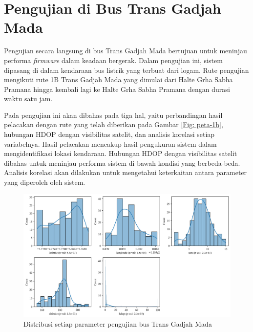 \section{Pengujian di Bus Trans Gadjah Mada}
Pengujian secara langsung di bus Trans Gadjah Mada bertujuan untuk meninjau performa \textit{firmware} dalam keadaan bergerak. Dalam pengujian ini, sistem dipasang di dalam kendaraan bus listrik yang terbuat dari logam. Rute pengujian mengikuti rute 1B Trans Gadjah Mada yang dimulai dari Halte Grha Sabha Pramana hingga kembali lagi ke Halte Grha Sabha Pramana dengan durasi waktu satu jam.

Pada pengujian ini akan dibahas pada tiga hal, yaitu perbandingan hasil pelacakan dengan rute yang telah diberikan pada Gambar \ref{Fig: peta-1b}, hubungan HDOP dengan visibilitas satelit, dan analisis korelasi setiap variabelnya. Hasil pelacakan mencakup hasil pengukuran sistem dalam mengidentifikasi lokasi kendaraan. Hubungan HDOP dengan visibilitas satelit dibahas untuk meninjau performa sistem di bawah kondisi yang berbeda-beda. Analisis korelasi akan dilakukan untuk mengetahui keterkaitan antara parameter yang diperoleh oleh sistem.

\begin{figure}[H]
	\centering
	\begin{adjustbox}{width=\textwidth}
		\includegraphics{contents/chapter-4/pengujian-bergerak/distribusi.png}
	\end{adjustbox}
	\caption{Distribusi setiap parameter pengujian bus Trans Gadjah Mada}
	\label{Fig: moving-distribusi}
\end{figure}

